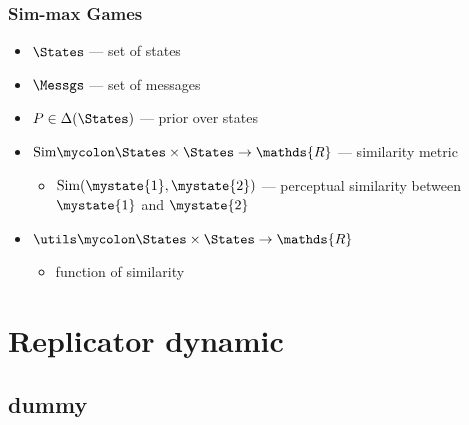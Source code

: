 \documentclass[fleqn,9pt,xcolor=dvipsnames]{beamer}
\begin{document}





\begin{frame}
  \frametitle{Sim-max Games}

    \begin{itemize}
    \item $\States$ --- set of states
    \item $\Messgs$ --- set of messages
    \item $P \in \Delta(\States)$ --- prior over states
    \item $\text{Sim} \mycolon \States \times \States \rightarrow \mathds{R}$ --- similarity metric
      \begin{itemize}
      \item $\text{Sim}(\mystate{1}, \mystate{2})$ --- perceptual similarity between
        $\mystate{1}$ and $\mystate{2}$ 
      \end{itemize}
    \item $\utils \mycolon \States \times \States \rightarrow \mathds{R}$
      \begin{itemize}
      \item function of similarity 
      \end{itemize}
    \end{itemize}

\end{frame}

\section{Replicator dynamic}
\subsection{dummy}
\end{document}

